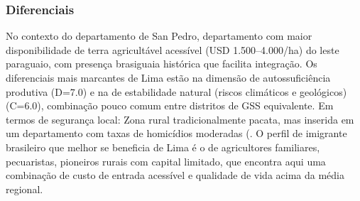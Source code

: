 \subsubsection*{Diferenciais}\label{dif-lima-0206}
No contexto do departamento de San Pedro, departamento com maior disponibilidade de terra agricultável acessível (USD 1.500–4.000/ha) do leste paraguaio, com presença brasiguaia histórica que facilita integração. Os diferenciais mais marcantes de Lima estão na dimensão de autossuficiência produtiva (D=7.0) e na de estabilidade natural (riscos climáticos e geológicos) (C=6.0), combinação pouco comum entre distritos de GSS equivalente. Em termos de segurança local: Zona rural tradicionalmente pacata, mas inserida em um departamento com taxas de homicídios moderadas (. O perfil de imigrante brasileiro que melhor se beneficia de Lima é o de agricultores familiares, pecuaristas, pioneiros rurais com capital limitado, que encontra aqui uma combinação de custo de entrada acessível e qualidade de vida acima da média regional.
